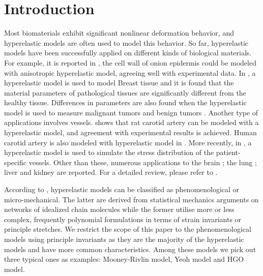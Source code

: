 \section{Introduction}
Most biomaterials exhibit significant nonlinear deformation behavior, and hyperelastic models are often used to model this behavior. So far, hyperelastic models have been successfully applied on different kinds of biological materials. For example, it is reported in \cite{Qian}, the cell wall of onion epidermis could be modeled with anisotropic hyperelastic model, agreeing well with experimental data. In  \cite{OHagen}, a hyperelastic model is used to model Breast tissue and it is found that the material parameters of pathological tissues are significantly different from the healthy tissue. Differences in parameters are also found when the hyperelastic model is used to measure malignant tumors and benign tumors \cite{Oberai}. Another type of applications involves vessels. \cite{Zidi} shows that rat carotid artery can be modeled with a hyperelastic model, and agreement with experimental results is achieved. Human carotid artery is also modeled with hyperelastic model in \cite{Zidi2}. More recently, in \cite{Bols}, a hyperelastic model is used to simulate the stress distribution of the patient-specific vessels.
Other than these, numerous applications to the brain \cite{Karimi, Samani, Gilchrist}; the lung \cite{Wall, Wall2}; liver and kidney \cite{Fu, Untaroiu, Willinger} are reported. For a detailed review, please refer to \cite{Kupriyanova}.

According to \cite{Steinmann}, hyperelastic models can be classified as phenomenological or micro-mechanical. The latter are derived from statistical mechanics arguments on networks of idealized chain molecules while the former utilise more or less complex, frequently polynomial formulations in terms of strain invariants or principle stretches. We restrict the scope of this paper to the phenomenological models using principle invariants as they are the majority of the hyperelastic models and have more common characteristics. Among these models we pick out three typical ones as examples: Mooney-Rivlin model, Yeoh model and HGO model.



